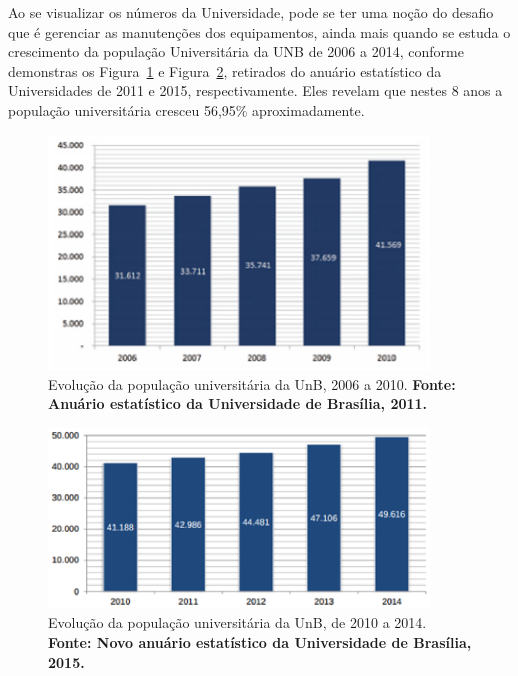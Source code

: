 Ao se visualizar os números da Universidade, pode se ter uma noção do desafio que é gerenciar as manutenções dos equipamentos, ainda mais quando se estuda o crescimento da população Universitária da UNB de 2006 a 2014, conforme demonstras os Figura~\ref{grafico_dimeq1} e Figura~\ref{grafico_dimeq2}, retirados do anuário estatístico da Universidades de 2011 e 2015, respectivamente. Eles revelam que nestes 8 anos a população universitária cresceu 56,95\% aproximadamente.

\graphicspath{{figuras/}}
\begin{figure}[h]
\centering
\includegraphics[width=0.9\textwidth]{grafico_dimeq1.eps}
\caption{Evolução da população universitária da UnB, 2006 a 2010. \textbf{Fonte: Anuário estatístico da Universidade de Brasília, 2011.}}
\label{grafico_dimeq1}
\end{figure}


\graphicspath{{figuras/}}
\begin{figure}[h]
\centering
\includegraphics[width=0.9\textwidth]{grafico_dimeq2.eps}
\caption{Evolução da população universitária da UnB, de 2010 a 2014. \textbf{Fonte: Novo anuário estatístico da Universidade de Brasília, 2015.}}
\label{grafico_dimeq2}
\end{figure}

